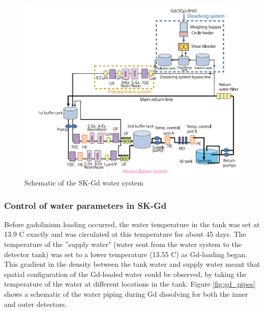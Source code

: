 \begin{figure}[H]
    \includegraphics[width=\textwidth]{Figures/skgd_water_system.png}
    \caption{Schematic of the SK-Gd water system}
    \label{fig:skgd_water_system}
    \end{figure}

\subsubsection{Control of water parameters in SK-Gd}

Before gadolinium loading occurred, the water temperature in the tank was set at 13.9 \degree C exactly and was circulated at this temperature for about 45 days. The temperature of the ''supply water" (water sent from the water system to the detector tank) was set to a lower temperature (13.55 \degree C) as Gd-loading began. This gradient in the density between the tank water and supply water meant that spatial configuration of the Gd-loaded water could be observed, by taking the temperature of the water at different locations in the tank. Figure \ref{fig:gd_pipes} shows a schematic of the water piping during Gd dissolving for both the inner and outer detectors. 



